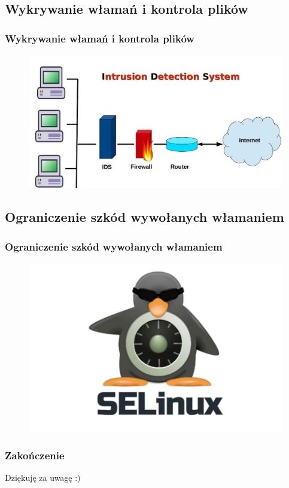 \documentclass{beamer}
\begin{document}
\subsection{Wykrywanie włamań i kontrola plików}
\begin{frame}
	\frametitle{Wykrywanie włamań i kontrola plików}
	\begin{figure}[H]
	\centering
	\includegraphics[width=1\textwidth]{ids.png}
	\end{figure}
\end{frame}

\subsection{Ograniczenie szkód wywołanych włamaniem}
\begin{frame}
	\frametitle{Ograniczenie szkód wywołanych włamaniem}
	\begin{figure}[H]
	\centering
	\includegraphics[width=1\textwidth]{selinux.png}
	\end{figure}
\end{frame}

\begin{frame}
	\centering
	\frametitle{Zakończenie}
	Dziękuję za uwagę :)
	\end{frame}
\end{document}
